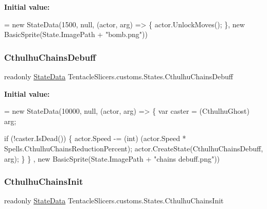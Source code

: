 {\bfseries Initial value\+:}
\begin{DoxyCode}
= \textcolor{keyword}{new} StateData(1500, null, (actor, arg) =>
        \{
            actor.UnlockMoves();
        \}, \textcolor{keyword}{new} BasicSprite(State.ImagePath + \textcolor{stringliteral}{"bomb.png"}))
\end{DoxyCode}
\mbox{\label{class_tentacle_slicers_1_1customs_1_1_states_ae5bcaae15503d28de3c4e93905101ec8}} 
\subsubsection{\texorpdfstring{Cthulhu\+Chains\+Debuff}{CthulhuChainsDebuff}}
{\footnotesize\ttfamily readonly \hyperlink{class_tentacle_slicers_1_1states_1_1_state_data}{State\+Data} Tentacle\+Slicers.\+customs.\+States.\+Cthulhu\+Chains\+Debuff\hspace{0.3cm}{\ttfamily [static]}}

{\bfseries Initial value\+:}
\begin{DoxyCode}
= \textcolor{keyword}{new} StateData(10000, null, (actor, arg) =>
        \{
            var caster = (CthulhuGhost) arg;
            
            \textcolor{keywordflow}{if} (!caster.IsDead())
            \{
                actor.Speed -= (int) (actor.Speed * Spells.CthulhuChainsReductionPercent);
                actor.CreateState(CthulhuChainsDebuff, arg);
            \}
        \} , \textcolor{keyword}{new} BasicSprite(State.ImagePath + \textcolor{stringliteral}{"chains debuff.png"}))
\end{DoxyCode}
\mbox{\label{class_tentacle_slicers_1_1customs_1_1_states_ae804c8d1d3cdb7f7c7e73feb3be7900a}} 
\subsubsection{\texorpdfstring{Cthulhu\+Chains\+Init}{CthulhuChainsInit}}
{\footnotesize\ttfamily readonly \hyperlink{class_tentacle_slicers_1_1states_1_1_state_data}{State\+Data} Tentacle\+Slicers.\+customs.\+States.\+Cthulhu\+Chains\+Init\hspace{0.3cm}{\ttfamily [static]}}

